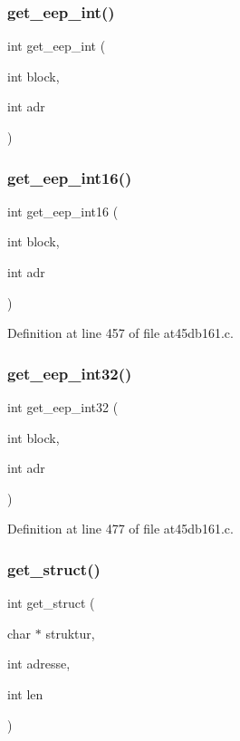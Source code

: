 \subsubsection{get\+\_\+eep\+\_\+int()}
{\footnotesize\ttfamily int get\+\_\+eep\+\_\+int (\begin{DoxyParamCaption}\item[{int}]{block,  }\item[{int}]{adr }\end{DoxyParamCaption})}

\mbox{\label{at45db161_8c_a10cc2d4ac3dbac1d56a6c84c5dc007b6}} 
\subsubsection{get\+\_\+eep\+\_\+int16()}
{\footnotesize\ttfamily int get\+\_\+eep\+\_\+int16 (\begin{DoxyParamCaption}\item[{int}]{block,  }\item[{int}]{adr }\end{DoxyParamCaption})}



Definition at line 457 of file at45db161.\+c.

\mbox{\label{at45db161_8c_aa39c05cf130ca8fab56f5f35f766fb43}} 
\subsubsection{get\+\_\+eep\+\_\+int32()}
{\footnotesize\ttfamily int get\+\_\+eep\+\_\+int32 (\begin{DoxyParamCaption}\item[{int}]{block,  }\item[{int}]{adr }\end{DoxyParamCaption})}



Definition at line 477 of file at45db161.\+c.

\mbox{\label{at45db161_8c_af8f36297b3dfaa0c729c2d7627140a9e}} 
\subsubsection{get\+\_\+struct()}
{\footnotesize\ttfamily int get\+\_\+struct (\begin{DoxyParamCaption}\item[{char $\ast$}]{struktur,  }\item[{int}]{adresse,  }\item[{int}]{len }\end{DoxyParamCaption})}



